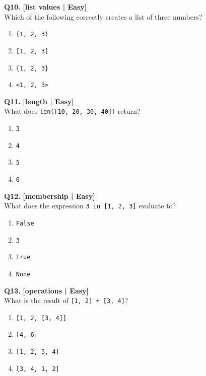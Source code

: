 \noindent\textbf{Q10.} \hfill {\small\color{LPUOrange}\textbf{[list values | Easy]}}\\[2pt]
Which of the following correctly creates a list of three numbers?

\begin{enumerate}[label=(\alph*),topsep=2pt,itemsep=1pt,partopsep=0pt,parsep=0pt]
    \item \relax \texttt{(1, 2, 3)}
    \item \relax \texttt{[1, 2, 3]}
    \item \relax \texttt{\{1, 2, 3\}}
    \item \relax \texttt{<1, 2, 3>}
\end{enumerate}
\vspace{2mm}

\noindent\textbf{Q11.} \hfill {\small\color{LPUOrange}\textbf{[length | Easy]}}\\[2pt]
What does \texttt{len([10, 20, 30, 40])} return?

\begin{enumerate}[label=(\alph*),topsep=2pt,itemsep=1pt,partopsep=0pt,parsep=0pt]
    \item \relax \texttt{3}
    \item \relax \texttt{4}
    \item \relax \texttt{5}
    \item \relax \texttt{0}
\end{enumerate}
\vspace{2mm}

\noindent\textbf{Q12.} \hfill {\small\color{LPUOrange}\textbf{[membership | Easy]}}\\[2pt]
What does the expression \texttt{3 in [1, 2, 3]} evaluate to?

\begin{enumerate}[label=(\alph*),topsep=2pt,itemsep=1pt,partopsep=0pt,parsep=0pt]
    \item \relax \texttt{False}
    \item \relax \texttt{3}
    \item \relax \texttt{True}
    \item \relax \texttt{None}
\end{enumerate}
\vspace{2mm}

\noindent\textbf{Q13.} \hfill {\small\color{LPUOrange}\textbf{[operations | Easy]}}\\[2pt]
What is the result of \texttt{[1, 2] + [3, 4]}?

\begin{enumerate}[label=(\alph*),topsep=2pt,itemsep=1pt,partopsep=0pt,parsep=0pt]
    \item \relax \texttt{[1, 2, [3, 4]]}
    \item \relax \texttt{[4, 6]}
    \item \relax \texttt{[1, 2, 3, 4]}
    \item \relax \texttt{[3, 4, 1, 2]}
\end{enumerate}
\vspace{2mm}

